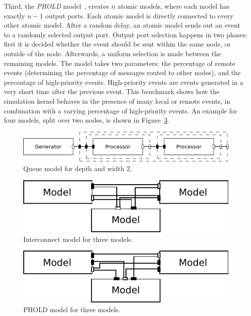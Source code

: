 Third, the \textit{PHOLD} model~\cite{PHOLD}, creates $n$ atomic models, where each model has exactly $n-1$ output ports.
Each atomic model is directly connected to every other atomic model.
After a random delay, an atomic model sends out an event to a randomly selected output port.
Output port selection happens in two phases: first it is decided whether the event should be sent within the same node, or outside of the node.
Afterwards, a uniform selection is made between the remaining models.
The model takes two parameters: the percentage of remote events (determining the percentage of messages routed to other nodes), and the percentage of high-priority events.
High-priority events are events generated in a very short time after the previous event.
This benchmark shows how the simulation kernel behaves in the presence of many local or remote events, in combination with a varying percentage of high-priority events.
An example for four models, split over two nodes, is shown in Figure~\ref{fig:PHOLD_model}.

\begin{figure}
	\center
	\includegraphics[width=\columnwidth]{fig/queue_model_fixed.pdf}
	\caption{Queue model for depth and width 2.}
	\label{fig:queue_model}
\end{figure}
	
\begin{figure}
    \center
	\includegraphics[width=\modelfraction\columnwidth]{fig/interconnect_model.pdf}
	\caption{Interconnect model for three models.}
	\label{fig:interconnect_model}
\end{figure}

\begin{figure}
    \center
	\includegraphics[width=\modelfraction\columnwidth]{fig/phold_model.pdf}
	\caption{PHOLD model for three models.}
	\label{fig:PHOLD_model}
\end{figure}

